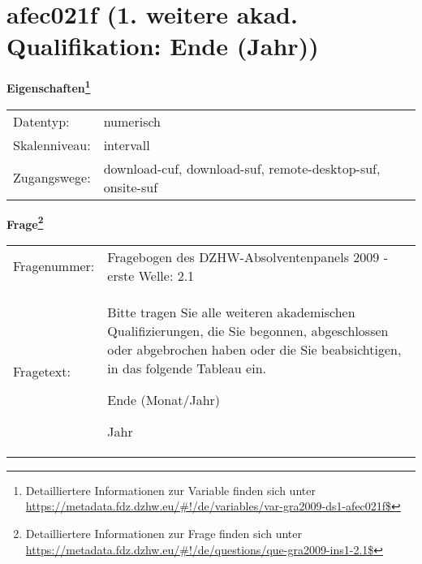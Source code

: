 
    \setcounter{footnote}{0}

    \vspace*{-1.8cm}
	\section{afec021f (1. weitere akad. Qualifikation: Ende (Jahr))}
	\label{section:afec021f}



    \vspace*{0.5cm}
    \noindent\textbf{Eigenschaften\footnote{Detailliertere Informationen zur Variable finden sich unter
		\url{https://metadata.fdz.dzhw.eu/\#!/de/variables/var-gra2009-ds1-afec021f$}}}\\
	\begin{tabularx}{\hsize}{@{}lX}
	Datentyp: & numerisch \\
	Skalenniveau: & intervall \\
	Zugangswege: &
	  download-cuf, 
	  download-suf, 
	  remote-desktop-suf, 
	  onsite-suf
 \\
    \end{tabularx}



				\vspace*{0.5cm}
                \noindent\textbf{Frage\footnote{Detailliertere Informationen zur Frage finden sich unter
		              \url{https://metadata.fdz.dzhw.eu/\#!/de/questions/que-gra2009-ins1-2.1$}}}\\
				\begin{tabularx}{\hsize}{@{}lX}
					Fragenummer: &
					  Fragebogen des DZHW-Absolventenpanels 2009 - erste Welle:
					  2.1
 \\
					Fragetext: & Bitte tragen Sie alle weiteren akademischen Qualifizierungen, die Sie begonnen, abgeschlossen oder abgebrochen haben oder die Sie beabsichtigen, in das folgende Tableau ein.\par  Ende (Monat/Jahr)\par  Jahr \\
				\end{tabularx}





